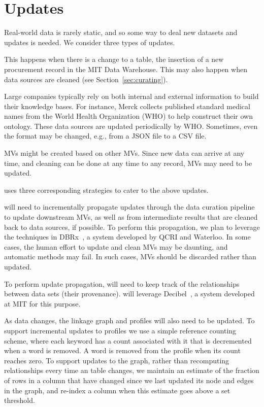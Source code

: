 \section{Updates}
\label{sec:updates}

Real-world data is rarely static, and so some way to deal new datasets and updates is needed. We consider three types of updates.

 This happens when there is a
change to a table, \eg the insertion of a new procurement record in the MIT Data
Warehouse. This may also happen when data sources are cleaned (see
Section~\ref{sec:curating}).


 Large companies typically rely on
both internal and external information to build their knowledge bases. For
instance, Merck collects published standard medical names from the World Health
Organization (WHO) to help construct their own ontology. These data sources are
updated periodically by WHO.  Sometimes, even the format may be changed, e.g.,
from a JSON file to a CSV file.


 MVs might be created based on other MVs.  Since
new data can arrive at any time, and cleaning can be done at any time to any record, MVs may need to be
updated.


\dcv uses three corresponding strategies to cater to the above updates.

 \dcv will need to incrementally propagate updates through the data curation pipeline to update downstream MVs, as well as from intermediate results that are cleaned back to data sources, if possible.
To perform this propagation, we plan to leverage the techniques in DBRx~\cite{DBLP:conf/sigmod/ChalamallaIOP14}, a system developed by QCRI and Waterloo.
In some cases, the human effort to update and clean MVs may be daunting, and automatic methods may fail. In such cases, MVs should be discarded rather than updated. 

  To perform update propagation, \dcv will need to keep track of the relationships between data sets (their provenance). \dcv will leverage Decibel~\cite{DBLP:journals/pvldb/MaddoxGEMPD16}, a system developed at MIT for this purpose.

  As data changes, the linkage graph and profiles will also need to be updated.  To support incremental updates  to profiles we  use a simple reference counting scheme, where each keyword has a count associated with it that is decremented when a word is removed.  A word
is removed from the profile when its count reaches zero.  To support updates to the graph, rather than recomputing relationships every time an table changes, we 
maintain an estimate of the fraction of rows in a column that have changed since we last updated its node and edges in the graph, and re-index a column when
this estimate goes above a set threshold.


